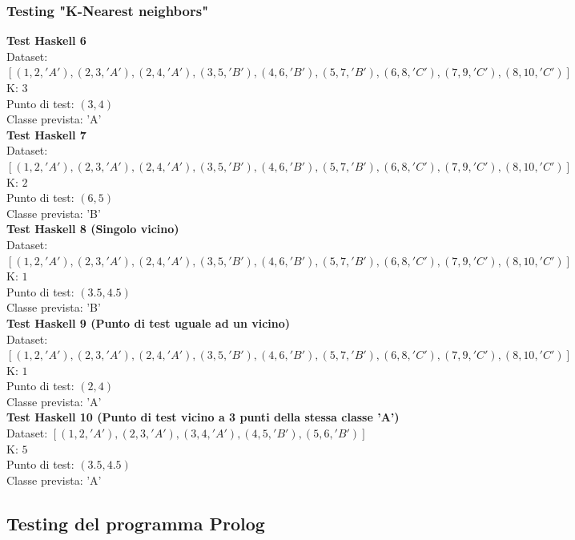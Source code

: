 \documentclass[11pt]{article}
\theoremstyle{definition}
\begin{document}
\subsubsection{Testing "K-Nearest neighbors"}
\textbf{Test Haskell 6}\\
Dataset: $[(1, 2, 'A'), (2, 3, 'A'), (2, 4, 'A'), (3, 5, 'B'), (4, 6, 'B'), (5, 7, 'B'), (6, 8, 'C'), (7, 9, 'C'), (8, 10, 'C')]$\\
K: $3$\\
Punto di test: $(3, 4)$\\
Classe prevista: 'A'\\
\newline
\textbf{Test Haskell 7}\\
Dataset: $[(1, 2, 'A'), (2, 3, 'A'), (2, 4, 'A'), (3, 5, 'B'), (4, 6, 'B'), (5, 7, 'B'), (6, 8, 'C'), (7, 9, 'C'), (8, 10, 'C')]$\\
K: $2$\\
Punto di test: $(6, 5)$\\
Classe prevista: 'B'\\
\newline
\textbf{Test Haskell 8 (Singolo vicino)}\\
Dataset: $[(1, 2, 'A'), (2, 3, 'A'), (2, 4, 'A'), (3, 5, 'B'), (4, 6, 'B'), (5, 7, 'B'), (6, 8, 'C'), (7, 9, 'C'), (8, 10, 'C')]$\\
K: $1$\\
Punto di test: $(3.5, 4.5)$\\
Classe prevista: 'B'\\
\newline
\textbf{Test Haskell 9 (Punto di test uguale ad un vicino)}\\
Dataset: $[(1, 2, 'A'), (2, 3, 'A'), (2, 4, 'A'), (3, 5, 'B'), (4, 6, 'B'), (5, 7, 'B'), (6, 8, 'C'), (7, 9, 'C'), (8, 10, 'C')]$\\
K: $1$\\
Punto di test: $(2, 4)$\\
Classe prevista: 'A'\\
\newline
\textbf{Test Haskell 10 (Punto di test vicino a 3 punti della stessa classe 'A')}\\
Dataset: $[(1, 2, 'A'), (2, 3, 'A'), (3, 4, 'A'), (4, 5, 'B'), (5, 6, 'B')]$\\
K: $5$\\
Punto di test: $(3.5, 4.5)$\\
Classe prevista: 'A'

\subsection{Testing del programma Prolog}
\end{document}
